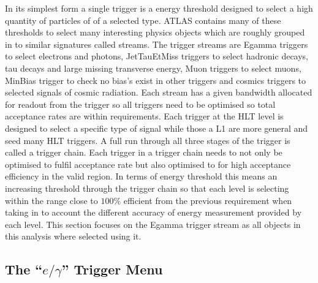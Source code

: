 	In its simplest form a single trigger is a energy threshold designed to select a high quantity of particles of of a selected type. ATLAS contains many of these thresholds to select many interesting physics objects which are roughly grouped in to similar signatures called streams. The trigger streams are Egamma triggers to select electrons and photons, JetTauEtMiss triggers to select hadronic decays, tau decays and large missing transverse energy, Muon triggers to select muons, MinBias trigger to check no bias's exist in other triggers and cosmics triggers to selected signals of cosmic radiation. Each stream has a given bandwidth allocated for readout from the trigger so all triggers need to be optimised so total acceptance rates are within requirements. Each trigger at the HLT level is designed to select a specific type of signal while those a L1 are more general and seed many HLT triggers. A full run through all three stages of the trigger is called a trigger chain. Each trigger in a trigger chain needs to not only be optimised to fulfil acceptance rate but also optimised to for high acceptance efficiency in the valid region. In terms of energy threshold this means an increasing threshold through the trigger chain so that each level is selecting within the range close to $100\%$ efficient from the previous requirement when taking in to account the different accuracy of energy measurement provided by each level. This section focuses on the Egamma trigger stream as all objects in this analysis where selected using it.



	\subsection{The ``$e/\gamma$'' Trigger Menu} 
		\label{sec:egammaMenu}

